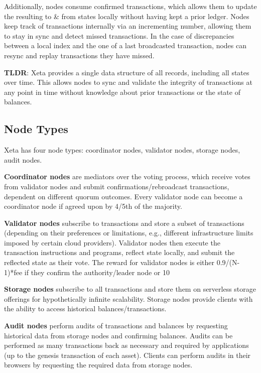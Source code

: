 \documentclass{article}
\begin{document}
Additionally, nodes consume confirmed transactions, which allows them to update the resulting to \& from states locally without having kept a prior ledger. Nodes keep track of transactions internally via an incrementing number, allowing them to stay in sync and detect missed transactions. In the case of discrepancies between a local index and the one of a last broadcasted transaction, nodes can resync and replay transactions they have missed.
\bigskip

\textbf{TLDR}: Xeta provides a single data structure of all records, including all states over time. This allows nodes to sync and validate the integrity of transactions at any point in time without knowledge about prior transactions or the state of balances.

\subsection{Node Types}
Xeta has four node types: coordinator nodes, validator nodes, storage nodes, audit nodes.
\bigskip

\textbf{Coordinator nodes} are mediators over the voting process, which receive votes from validator nodes and submit confirmations/rebroadcast transactions, dependent on different quorum outcomes. Every validator node can become a coordinator node if agreed upon by 4/5th of the majority.
\bigskip

\textbf{Validator nodes} subscribe to transactions and store a subset of transactions (depending on their preferences or limitations, e.g., different infrastructure limits imposed by certain cloud providers). Validator nodes then execute the transaction instructions and programs, reflect state locally, and submit the reflected state as their vote. The reward for validator nodes is either 0.9/(N-1)*fee if they confirm the authority/leader node or 10%
\bigskip

\textbf{Storage nodes} subscribe to all transactions and store them on serverless storage offerings for hypothetically infinite scalability. Storage nodes provide clients with the ability to access historical balances/transactions.
\bigskip

\textbf{Audit nodes} perform audits of transactions and balances by requesting historical data from storage nodes and confirming balances. Audits can be performed as many transactions back as necessary and required by applications (up to the genesis transaction of each asset). Clients can perform audits in their browsers by requesting the required data from storage nodes.
\bigskip
\end{document}
